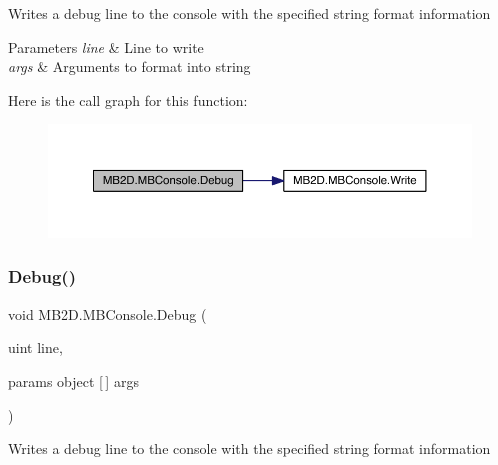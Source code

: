 Writes a debug line to the console with the specified string format information 


\begin{DoxyParams}{Parameters}
{\em line} & Line to write\\
\hline
{\em args} & Arguments to format into string\\
\hline
\end{DoxyParams}
Here is the call graph for this function\+:
\nopagebreak
\begin{figure}[H]
\begin{center}
\leavevmode
\includegraphics[width=350pt]{class_m_b2_d_1_1_m_b_console_a1235820bedb1bc0598c863a0d7033329_cgraph}
\end{center}
\end{figure}
\hypertarget{class_m_b2_d_1_1_m_b_console_aef53935b8ae3c6cd2b87a81e5dbcdf1e}{}\label{class_m_b2_d_1_1_m_b_console_aef53935b8ae3c6cd2b87a81e5dbcdf1e} 
\subsubsection{\texorpdfstring{Debug()}{Debug()}\hspace{0.1cm}{\footnotesize\ttfamily [3/4]}}
{\footnotesize\ttfamily void M\+B2\+D.\+M\+B\+Console.\+Debug (\begin{DoxyParamCaption}\item[{uint}]{line,  }\item[{params object \mbox{[}$\,$\mbox{]}}]{args }\end{DoxyParamCaption})\hspace{0.3cm}{\ttfamily [inline]}}



Writes a debug line to the console with the specified string format information 



